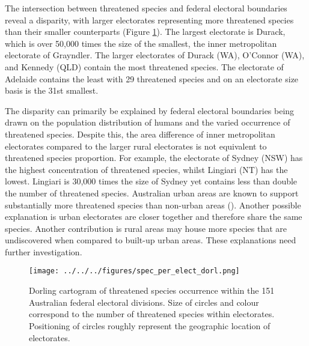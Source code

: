 \documentclass[a4paper,11pt]{article}
\begin{document}
The intersection between threatened species and federal electoral boundaries reveal a disparity, with larger electorates representing more threatened species than their smaller counterparts (Figure \ref{fig:dorl}). The largest electorate is Durack, which is over 50,000 times the size of the smallest, the inner metropolitan electorate of Grayndler. The larger electorates of Durack (WA), O'Connor (WA), and Kennedy (QLD) contain the most threatened species. The electorate of Adelaide contains the least with 29 threatened species and on an electorate size basis is the 31st smallest. 

The disparity can primarily be explained by federal electoral boundaries being drawn on the population distribution of humans and the varied occurrence of threatened species. Despite this, the area difference of inner metropolitan electorates compared to the larger rural electorates is not equivalent to threatened species proportion. For example, the electorate of Sydney (NSW) has the highest concentration of threatened species, whilst Lingiari (NT) has the lowest. Lingiari is 30,000 times the size of Sydney yet contains less than double the number of threatened species. Australian urban areas are known to support substantially more threatened species than non-urban areas (\cite{ivesCitiesAreHotspots2016, soanesConservationOpportunitiesThreatened2020}). Another possible explanation is urban electorates are closer together and therefore share the same species. Another contribution is rural areas may house more species that are undiscovered when compared to built-up urban areas. These explanations need further investigation.

\begin{figure}[H]
	\centering
    \texttt{[image: ../../../figures/spec\_per\_elect\_dorl.png]}
    \caption{Dorling cartogram of threatened species occurrence within the 151 Australian federal electoral divisions. Size of circles and colour correspond to the number of threatened species within electorates. Positioning of circles roughly represent the geographic location of electorates.}
    \label{fig:dorl}
\end{figure}
\end{document}
